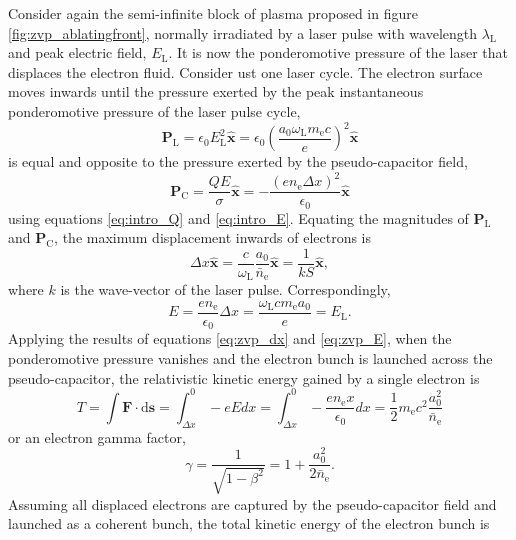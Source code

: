 Consider again the semi-infinite block of plasma proposed in figure \ref{fig:zvp_ablatingfront}, normally irradiated by a laser pulse with wavelength $\lambda_\mathrm{L}$ and peak electric field, $E_\mathrm{L}$. It is now the ponderomotive pressure of the laser that displaces the electron fluid. Consider ust one laser cycle. The electron surface moves inwards until the pressure exerted by the peak instantaneous ponderomotive pressure of the laser pulse cycle,
\begin{equation}
	\mathbf{P}_\mathrm{L} = \epsilon_0 E^2_\mathrm{L} \hat{\mathbf{x}} = \epsilon_0 \left(\frac{a_0\omega_\mathrm{L}m_\mathrm{e}c}{e}\right)^2 \hat{\mathbf{x}}
\end{equation}
is equal and opposite to the pressure exerted by the pseudo-capacitor field,
\begin{equation}
	\mathbf{P}_\mathrm{C} = \frac{QE}{\sigma} \hat{\mathbf{x}}= -\frac{(en_\mathrm{e}\Delta x)^2}{\epsilon_0}\hat{\mathbf{x}}
\end{equation} 
using equations \ref{eq:intro_Q} and \ref{eq:intro_E}. Equating the magnitudes of $\mathbf{P}_\mathrm{L}$ and $\mathbf{P}_\mathrm{C}$, the maximum displacement inwards of electrons is
\begin{equation}\label{eq:zvp_dx}
	\Delta x \hat{\mathbf{x}} = \frac{c}{\omega_\mathrm{L}}\frac{a_0}{\bar{n}_\mathrm{e}}\hat{\mathbf{x}}  = \frac{1}{kS}\hat{\mathbf{x}},
\end{equation}
where $k$ is the wave-vector of the laser pulse. Correspondingly,
\begin{equation}\label{eq:zvp_E}
	E = \frac{en_\mathrm{e}}{\epsilon_0}\Delta x = \frac{\omega_\mathrm{L}cm_\mathrm{e}a_0}{e} = E_\mathrm{L}.
\end{equation}
Applying the results of equations \ref{eq:zvp_dx} and \ref{eq:zvp_E}, when the ponderomotive pressure vanishes and the electron bunch is launched across the pseudo-capacitor, the relativistic kinetic energy gained by a single electron is
\begin{equation}\label{eq:zvp_T}
	T =  \int \mathbf{F}\cdot\mathrm{d}\mathbf{s} = \int^0_{\Delta x} -eEdx = \int^0_{\Delta x}-\frac{en_\mathrm{e}x}{\epsilon_0}dx = \frac{1}{2}m_\mathrm{e}c^2\frac{a^2_0}{\bar{n}_\mathrm{e}}
\end{equation}
or an electron gamma factor,
\begin{equation}
	\gamma = \frac{1}{\sqrt{1-\beta^2}} = 1 + \frac{a_0^2}{2\bar{n}_\mathrm{e}}.
\end{equation}
Assuming all displaced electrons are captured by the pseudo-capacitor field and launched as a coherent bunch, the total kinetic energy of the electron bunch is
